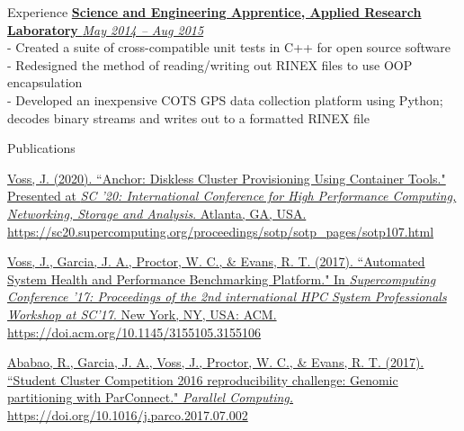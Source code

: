 \documentclass{resume} %
\begin{document}
\begin{rSection}{Experience}
\href{http://arlut.utexas.edu}
{\textbf{Science and Engineering Apprentice, Applied Research Laboratory}
  \hfill{\em May 2014 -- Aug 2015}}
\\- Created a suite of cross-compatible unit tests in C++ for open source software
\\- Redesigned the method of reading/writing out RINEX files to use OOP encapsulation
\\- Developed an inexpensive COTS GPS data collection platform using Python; decodes binary streams and writes out to a formatted RINEX file

\end{rSection}

\begin{rSection}{Publications}

\href{https://sc20.supercomputing.org/proceedings/sotp/sotp_pages/sotp107.html}
{\underline{Voss, J.} (2020). ``Anchor: Diskless Cluster Provisioning Using
Container Tools."
Presented at \textit{SC '20: International Conference for High Performance Computing,
Networking, Storage and Analysis}. Atlanta, GA, USA. \linebreak
https://sc20.supercomputing.org/proceedings/sotp/sotp\_pages/sotp107.html}

\href{http://doi.acm.org/10.1145/3155105.3155106}
{\underline{Voss, J.}, Garcia, J. A., Proctor, W. C., \& Evans, R. T.
(2017). ``Automated System Health and Performance Benchmarking Platform."
In \textit{Supercomputing Conference '17: Proceedings of the 2nd international
HPC System Professionals Workshop at SC'17}. New York, NY, USA: ACM.
https://doi.acm.org/10.1145/3155105.3155106}

\href{https://doi.org/10.1016/j.parco.2017.07.002}
{Ababao, R., Garcia, J. A., \underline{Voss, J.}, Proctor, W. C., \& Evans, R.
T. (2017). ``Student Cluster \linebreak Competition 2016 reproducibility challenge: Genomic
partitioning with ParConnect." \textit{Parallel Computing.} \linebreak https://doi.org/10.1016/j.parco.2017.07.002}

\end{rSection}

%
%
%
\end{document}
